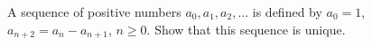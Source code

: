 A sequence of positive numbers $a_0, a_1, a_2, \ldots$ is defined by $a_0 = 1$, $a_{n+2} = a_n - a_{n+1}$, $n \geq 0$. Show that this sequence is unique.
